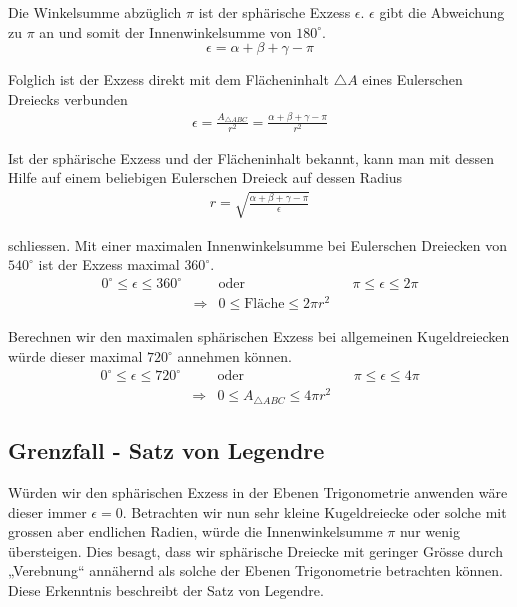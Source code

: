 \begin{refsection}
Die Winkelsumme abzüglich $\pi$ ist der sphärische Exzess $\epsilon$. $\epsilon$ gibt die Abweichung zu $\pi$ an und somit der Innenwinkelsumme von $180^{\circ}$.
\begin{equation}
\epsilon = \alpha + \beta + \gamma - \pi
\end{equation}


Folglich ist der Exzess direkt mit dem Flächeninhalt $\triangle A$ eines Eulerschen Dreiecks verbunden
\begin{align*}
\epsilon =\frac{A_{\triangle{ ABC }}}{r^2} = \frac{\alpha + \beta + \gamma - \pi}{r^2}
\end{align*}

Ist der sphärische Exzess und der Flächeninhalt bekannt, kann man mit dessen Hilfe auf einem beliebigen Eulerschen Dreieck auf dessen Radius
\begin{align*}
r = \sqrt{\frac{\alpha + \beta + \gamma - \pi}{\epsilon}}
\end{align*}

schliessen. Mit einer maximalen Innenwinkelsumme bei Eulerschen Dreiecken von $540^{\circ}$ ist der Exzess maximal $360^{\circ}$.
\[
\begin{aligned}
0^{\circ} \le \epsilon \le 360^{\circ}
&
&\text{oder}
&
&\pi \le \epsilon \le 2\pi \\
&\Rightarrow
& 0 \le \text{Fläche} \le 2 \pi r^2
\end{aligned}
\]

Berechnen wir den maximalen sphärischen Exzess bei allgemeinen Kugeldreiecken würde dieser maximal $720^{\circ}$ annehmen können.
\[
\begin{aligned}
0^{\circ} \le \epsilon \le 720^{\circ}
&
&\text{oder}
&
&\pi \le \epsilon \le 4\pi \\
&\Rightarrow
& 0 \le A_{\triangle{ ABC }} \le 4 \pi r^2
\end{aligned}
\]



\subsection{Grenzfall - Satz von Legendre}
Würden wir den sphärischen Exzess in der Ebenen Trigonometrie anwenden wäre dieser immer $\epsilon=0$. Betrachten wir nun sehr kleine Kugeldreiecke oder solche mit grossen aber endlichen Radien, würde die Innenwinkelsumme $\pi$ nur wenig übersteigen. Dies besagt, dass wir sphärische Dreiecke mit geringer Grösse durch „Verebnung“ annähernd als solche der Ebenen Trigonometrie betrachten können. Diese Erkenntnis beschreibt der Satz von Legendre.


\end{refsection}
